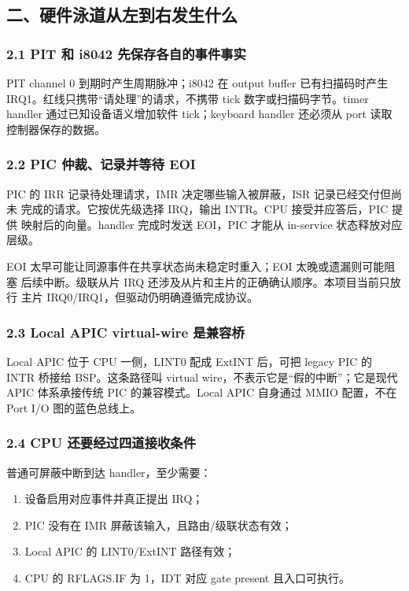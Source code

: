 \subsection{二、硬件泳道从左到右发生什么}

\subsubsection{2.1 PIT 和 i8042 先保存各自的事件事实}

PIT channel 0 到期时产生周期脉冲；i8042 在 output buffer 已有扫描码时产生
IRQ1。红线只携带“请处理”的请求，不携带 tick 数字或扫描码字节。timer handler
通过已知设备语义增加软件 tick；keyboard handler 还必须从 port
 读取控制器保存的数据。

\subsubsection{2.2 PIC 仲裁、记录并等待 EOI}

PIC 的 IRR 记录待处理请求，IMR 决定哪些输入被屏蔽，ISR 记录已经交付但尚未
完成的请求。它按优先级选择 IRQ，输出 INTR。CPU 接受并应答后，PIC 提供
映射后的向量。handler 完成时发送 EOI，PIC 才能从 in-service 状态释放对应
层级。

EOI 太早可能让同源事件在共享状态尚未稳定时重入；EOI 太晚或遗漏则可能阻塞
后续中断。级联从片 IRQ 还涉及从片和主片的正确确认顺序。本项目当前只放行
主片 IRQ0/IRQ1，但驱动仍明确遵循完成协议。

\subsubsection{2.3 Local APIC virtual-wire 是兼容桥}

Local APIC 位于 CPU 一侧，LINT0 配成 ExtINT 后，可把 legacy PIC 的 INTR
桥接给 BSP。这条路径叫 virtual wire，不表示它是“假的中断”；它是现代 APIC
体系承接传统 PIC 的兼容模式。Local APIC 自身通过 MMIO 配置，不在 Port I/O
图的蓝色总线上。

\subsubsection{2.4 CPU 还要经过四道接收条件}

普通可屏蔽中断到达 handler，至少需要：

\begin{enumerate}[leftmargin=2.2em]
  \item 设备启用对应事件并真正提出 IRQ；
  \item PIC 没有在 IMR 屏蔽该输入，且路由/级联状态有效；
  \item Local APIC 的 LINT0/ExtINT 路径有效；
  \item CPU 的 RFLAGS.IF 为 1，IDT 对应 gate present 且入口可执行。
\end{enumerate}

